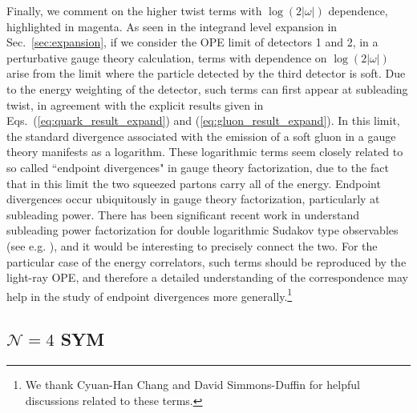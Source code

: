 \documentclass[letterpaper,11pt]{article}
\def\cN{\mathcal{N}}
\DeclareRobustCommand{\Sec}[1]{Sec.~\ref{#1}}
\DeclareRobustCommand{\Eqs}[2]{Eqs.~(\ref{#1}) and (\ref{#2})}
\begin{document}
Finally, we comment on the higher twist terms with $\log(2|\omega|)$ dependence, highlighted in magenta.
As seen in the integrand level expansion in \Sec{sec:expansion}, if we consider the OPE limit of detectors 1 and 2, in a perturbative gauge theory calculation, terms with dependence on $\log(2|\omega|)$ arise from the limit where the particle detected by the third detector is soft. Due to the energy weighting of the detector, such terms can first appear at subleading twist, in agreement with the explicit results given in \Eqs{eq:quark_result_expand}{eq:gluon_result_expand}. In this limit, the standard divergence associated with the emission of a soft gluon in a gauge theory manifests as a logarithm. These logarithmic terms seem closely related to so called ``endpoint divergences" in gauge theory factorization, due to the fact that in this limit the two squeezed partons carry all of the energy. Endpoint divergences occur ubiquitously in gauge theory factorization, particularly at subleading power. There has been significant recent work in understand subleading power factorization for double logarithmic Sudakov type observables (see e.g. \cite{Moult:2018jjd,Beneke:2018gvs,Moult:2019vou,Moult:2019uhz,Beneke:2019mua,Liu:2019oav,Liu:2020tzd,Liu:2020wbn}), and it would be interesting to precisely connect the two. For the particular case of the energy correlators, such terms should be reproduced by the light-ray OPE, and therefore a detailed understanding of the correspondence may help in the study of endpoint divergences more generally.\footnote{We thank Cyuan-Han Chang and David Simmons-Duffin for helpful discussions related to these terms.}



\subsection{$\cN=4$ SYM}
\end{document}
